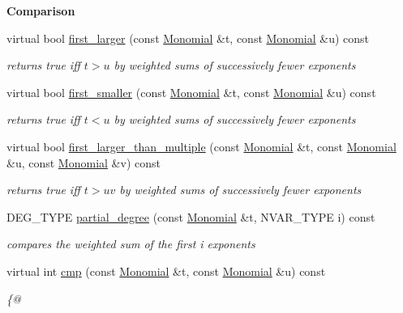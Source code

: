 \begin{Indent}\textbf{ Comparison}\par
\begin{DoxyCompactItemize}
\item 
\mbox{\label{class_w_grevlex_afe5920291578c4cdac316a03328c5b10}} 
virtual bool \hyperlink{class_w_grevlex_afe5920291578c4cdac316a03328c5b10}{first\+\_\+larger} (const \hyperlink{class_monomial}{Monomial} \&t, const \hyperlink{class_monomial}{Monomial} \&u) const
\begin{DoxyCompactList}\small\item\em returns {\ttfamily true} iff $t>u$ by weighted sums of successively fewer exponents \end{DoxyCompactList}\item 
\mbox{\label{class_w_grevlex_acfd20ecab0b278322ecc7b60e52b6d40}} 
virtual bool \hyperlink{class_w_grevlex_acfd20ecab0b278322ecc7b60e52b6d40}{first\+\_\+smaller} (const \hyperlink{class_monomial}{Monomial} \&t, const \hyperlink{class_monomial}{Monomial} \&u) const
\begin{DoxyCompactList}\small\item\em returns {\ttfamily true} iff $t< u$ by weighted sums of successively fewer exponents \end{DoxyCompactList}\item 
\mbox{\label{class_w_grevlex_a48765c47efecc385b6578c9b97353e30}} 
virtual bool \hyperlink{class_w_grevlex_a48765c47efecc385b6578c9b97353e30}{first\+\_\+larger\+\_\+than\+\_\+multiple} (const \hyperlink{class_monomial}{Monomial} \&t, const \hyperlink{class_monomial}{Monomial} \&u, const \hyperlink{class_monomial}{Monomial} \&v) const
\begin{DoxyCompactList}\small\item\em returns {\ttfamily true} iff $t>uv$ by weighted sums of successively fewer exponents \end{DoxyCompactList}\item 
D\+E\+G\+\_\+\+T\+Y\+PE \hyperlink{class_w_grevlex_ad7e630709c14774bac365c46b9455bab}{partial\+\_\+degree} (const \hyperlink{class_monomial}{Monomial} \&t, N\+V\+A\+R\+\_\+\+T\+Y\+PE i) const
\begin{DoxyCompactList}\small\item\em compares the weighted sum of the first i exponents \end{DoxyCompactList}\item 
virtual int \hyperlink{class_w_grevlex_a0bef53b45ac32ad5246b438bc4701be1}{cmp} (const \hyperlink{class_monomial}{Monomial} \&t, const \hyperlink{class_monomial}{Monomial} \&u) const
\begin{DoxyCompactList}\small\item\em \{@ \end{DoxyCompactList}\end{DoxyCompactItemize}
\end{Indent}
